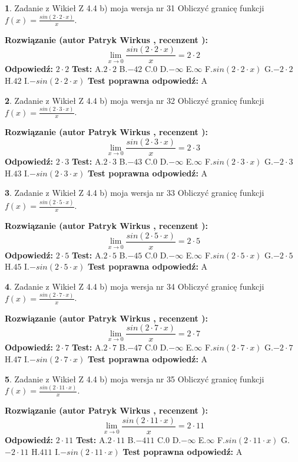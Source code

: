 \documentclass[12pt, a4paper]{article}
\theoremstyle{definition} %
\newtheorem{zad}{}
\newcommand{\zadStart}[1]{\begin{zad}#1\newline}
\newcommand{\zadStop}{\end{zad}}
\newcommand{\rozwStart}[2]{\noindent \textbf{Rozwiązanie (autor #1 , recenzent #2): }\newline}
\newcommand{\rozwStop}{\newline}
\newcommand{\odpStart}{\noindent \textbf{Odpowiedź:}\newline}
\newcommand{\odpStop}{\newline}
\newcommand{\testStart}{\noindent \textbf{Test:}\newline}
\newcommand{\testStop}{\newline}
\newcommand{\kluczStart}{\noindent \textbf{Test poprawna odpowiedź:}\newline}
\newcommand{\kluczStop}{\newline}
\begin{document}
\zadStart{Zadanie z Wikieł Z 4.4 b) moja wersja nr 31}
Obliczyć granicę funkcji $f(x)=\frac{sin(2 \cdot2\cdot x)}{x}$.
\zadStop
\rozwStart{Patryk Wirkus}{}
$$\lim\limits_{x\to 0}\frac{sin(2 \cdot 2\cdot x)}{x}=
2 \cdot 2$$
\rozwStop
\odpStart
$2 \cdot 2$
\odpStop
\testStart
A.$2 \cdot 2$
B.$-42$
C.$0$
D.$-\infty$
E.$\infty$
F.$sin(2 \cdot 2\cdot x)$
G.$-2 \cdot 2$
H.$42$
I.$-sin(2 \cdot 2\cdot x)$
\testStop
\kluczStart
A
\kluczStop



\zadStart{Zadanie z Wikieł Z 4.4 b) moja wersja nr 32}
Obliczyć granicę funkcji $f(x)=\frac{sin(2 \cdot3\cdot x)}{x}$.
\zadStop
\rozwStart{Patryk Wirkus}{}
$$\lim\limits_{x\to 0}\frac{sin(2 \cdot 3\cdot x)}{x}=
2 \cdot 3$$
\rozwStop
\odpStart
$2 \cdot 3$
\odpStop
\testStart
A.$2 \cdot 3$
B.$-43$
C.$0$
D.$-\infty$
E.$\infty$
F.$sin(2 \cdot 3\cdot x)$
G.$-2 \cdot 3$
H.$43$
I.$-sin(2 \cdot 3\cdot x)$
\testStop
\kluczStart
A
\kluczStop



\zadStart{Zadanie z Wikieł Z 4.4 b) moja wersja nr 33}
Obliczyć granicę funkcji $f(x)=\frac{sin(2 \cdot5\cdot x)}{x}$.
\zadStop
\rozwStart{Patryk Wirkus}{}
$$\lim\limits_{x\to 0}\frac{sin(2 \cdot 5\cdot x)}{x}=
2 \cdot 5$$
\rozwStop
\odpStart
$2 \cdot 5$
\odpStop
\testStart
A.$2 \cdot 5$
B.$-45$
C.$0$
D.$-\infty$
E.$\infty$
F.$sin(2 \cdot 5\cdot x)$
G.$-2 \cdot 5$
H.$45$
I.$-sin(2 \cdot 5\cdot x)$
\testStop
\kluczStart
A
\kluczStop



\zadStart{Zadanie z Wikieł Z 4.4 b) moja wersja nr 34}
Obliczyć granicę funkcji $f(x)=\frac{sin(2 \cdot7\cdot x)}{x}$.
\zadStop
\rozwStart{Patryk Wirkus}{}
$$\lim\limits_{x\to 0}\frac{sin(2 \cdot 7\cdot x)}{x}=
2 \cdot 7$$
\rozwStop
\odpStart
$2 \cdot 7$
\odpStop
\testStart
A.$2 \cdot 7$
B.$-47$
C.$0$
D.$-\infty$
E.$\infty$
F.$sin(2 \cdot 7\cdot x)$
G.$-2 \cdot 7$
H.$47$
I.$-sin(2 \cdot 7\cdot x)$
\testStop
\kluczStart
A
\kluczStop



\zadStart{Zadanie z Wikieł Z 4.4 b) moja wersja nr 35}
Obliczyć granicę funkcji $f(x)=\frac{sin(2 \cdot11\cdot x)}{x}$.
\zadStop
\rozwStart{Patryk Wirkus}{}
$$\lim\limits_{x\to 0}\frac{sin(2 \cdot 11\cdot x)}{x}=
2 \cdot 11$$
\rozwStop
\odpStart
$2 \cdot 11$
\odpStop
\testStart
A.$2 \cdot 11$
B.$-411$
C.$0$
D.$-\infty$
E.$\infty$
F.$sin(2 \cdot 11\cdot x)$
G.$-2 \cdot 11$
H.$411$
I.$-sin(2 \cdot 11\cdot x)$
\testStop
\kluczStart
A
\kluczStop
\end{document}
